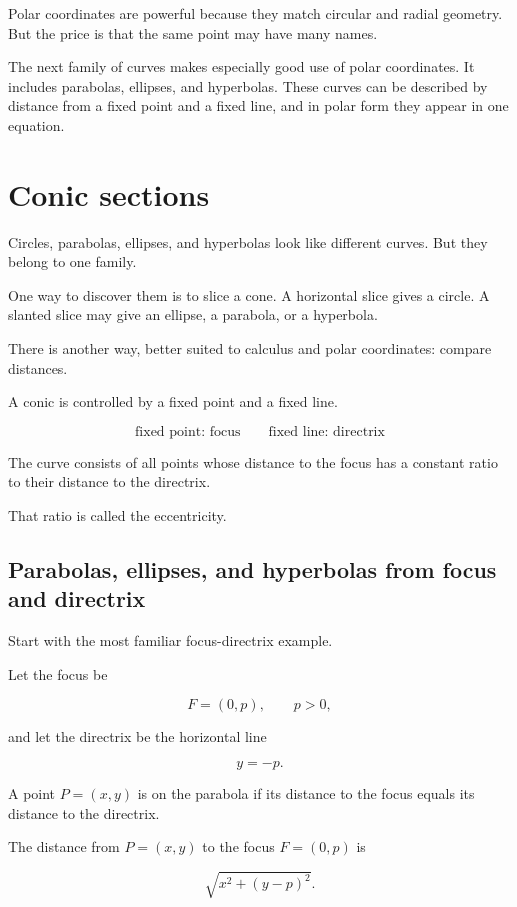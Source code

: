 Polar coordinates are powerful because they match circular and radial geometry.  But
the price is that the same point may have many names.

The next family of curves makes especially good use of polar coordinates.  It includes
parabolas, ellipses, and hyperbolas.  These curves can be described by distance from a
fixed point and a fixed line, and in polar form they appear in one equation.

\section{Conic sections}
\label{sec:conic-sections}

Circles, parabolas, ellipses, and hyperbolas look like different curves.  But they belong
to one family.

One way to discover them is to slice a cone.  A horizontal slice gives a circle.  A slanted
slice may give an ellipse, a parabola, or a hyperbola.

There is another way, better suited to calculus and polar coordinates: compare distances.

A conic is controlled by a fixed point and a fixed line.

\[
\text{fixed point: focus}
\qquad
\text{fixed line: directrix}
\]

The curve consists of all points whose distance to the focus has a constant ratio to their
distance to the directrix.

That ratio is called the eccentricity.

\subsection{Parabolas, ellipses, and hyperbolas from focus and directrix}
\label{subsec:conics-focus-directrix}

Start with the most familiar focus-directrix example.

Let the focus be

\[
F=(0,p),
\qquad p>0,
\]

and let the directrix be the horizontal line

\[
y=-p.
\]

A point \(P=(x,y)\) is on the parabola if its distance to the focus equals its distance to
the directrix.

The distance from \(P=(x,y)\) to the focus \(F=(0,p)\) is

\[
\sqrt{x^2+(y-p)^2}.
\]

